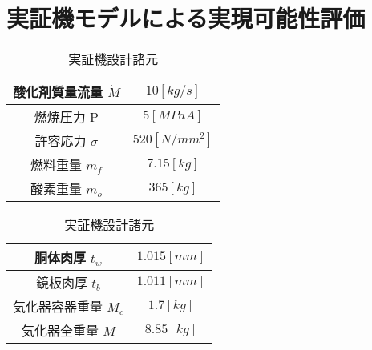 \chapter{実証機モデルによる実現可能性評価}
\newcommand{\FigAddFour}{./src/Chapter4/Figure}



\begin{table}[htb]
\begin{center}
\caption{実証機設計諸元}
\begin{tabular}{|c|c|} \hline
酸化剤質量流量 $\dot{M}$ 			&$10[kg/s]$		\\ \hline
燃焼圧力 P 			&$5[MPaA]$		\\ \hline
許容応力 $\sigma$	&$520[N/mm^2]$	\\ \hline
燃料重量 $m_f$		 &$7.15[kg]$ 	 \\ \hline
酸素重量 $m_o$		 &$365[kg]$  \\ \hline
\end{tabular}
\label{tab:RealModel}
\end{center}
\end{table}

\begin{table}[htb]
\begin{center}
\caption{実証機設計諸元}
\begin{tabular}{|c|c|} \hline
胴体肉厚 $t_w$			&$1.015[mm]$		\\ \hline
鏡板肉厚 $t_b$			&$1.011[mm]$	\\ \hline
気化器容器重量 $M_c$	&$1.7[kg]$ 	 \\ \hline
気化器全重量 $M$		&$8.85[kg]$  \\ \hline
\end{tabular}
\label{tab:RealResult}
\end{center}
\end{table}
